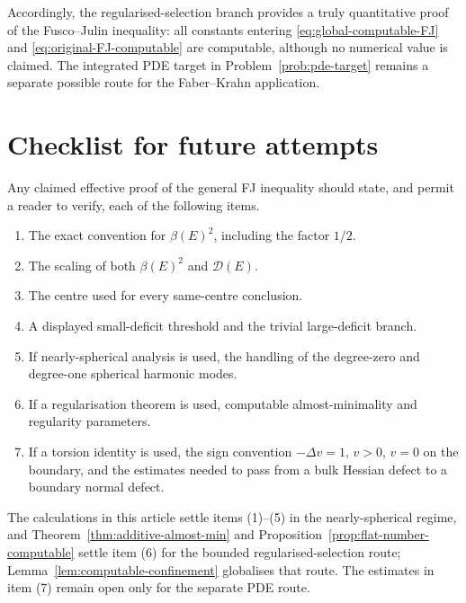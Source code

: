 \documentclass[11pt]{amsart}
\theoremstyle{definition}
\newcommand{\Def}{\mathcal D}
\begin{document}
Accordingly, the regularised-selection branch provides a truly quantitative
proof of the Fusco--Julin inequality: all constants entering
\eqref{eq:global-computable-FJ} and \eqref{eq:original-FJ-computable} are
computable, although no numerical value is claimed.  The integrated PDE
target in Problem~\ref{prob:pde-target} remains a separate possible route
for the Faber--Krahn application.

\section{Checklist for future attempts}\label{sec:checklist}

Any claimed effective proof of the general FJ inequality should state, and
permit a reader to verify, each of the following items.
\begin{enumerate}[label=\textnormal{(\arabic*)},leftmargin=2.6em]
\item The exact convention for \(\beta(E)^2\), including the factor \(1/2\).
\item The scaling of both \(\beta(E)^2\) and \(\Def(E)\).
\item The centre used for every same-centre conclusion.
\item A displayed small-deficit threshold and the trivial large-deficit
branch.
\item If nearly-spherical analysis is used, the handling of the degree-zero
and degree-one spherical harmonic modes.
\item If a regularisation theorem is used, computable almost-minimality and
regularity parameters.
\item If a torsion identity is used, the sign convention
\(-\Delta v=1\), \(v>0\), \(v=0\) on the boundary, and the estimates needed
to pass from a bulk Hessian defect to a boundary normal defect.
\end{enumerate}

The calculations in this article settle items (1)--(5) in the
nearly-spherical regime, and Theorem~\ref{thm:additive-almost-min}
and Proposition~\ref{prop:flat-number-computable} settle item (6) for
the bounded regularised-selection route; Lemma~\ref{lem:computable-confinement}
globalises that route.  The estimates in item (7) remain open only for the
separate PDE route.
\end{document}
